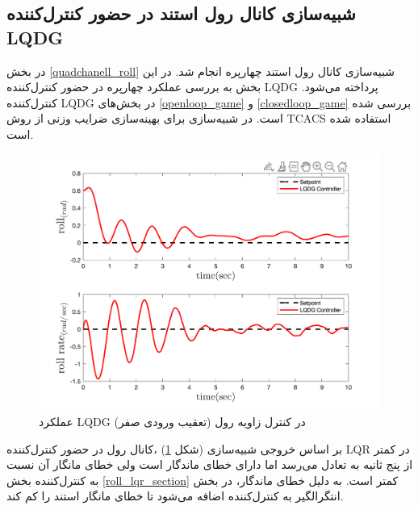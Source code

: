 \subsection{شبیه‌سازی کانال رول استند در حضور کنترل‌کننده LQDG}
در بخش
\ref{quadchanell_roll}
شبیه‌سازی کانال رول استند چهارپره انجام شد. در این بخش به بررسی عملکرد چهارپره در حضور کنترل‌کننده LQDG پرداخته می‌شود. کنترل‌کننده LQDG در بخش‌های
\ref{openloop_game}
و
\ref{closedloop_game}
بررسی شده است.
 در شبیه‌سازی برای بهینه‌سازی ضرایب وزنی از روش
TCACS \cite{Karimi2010}
استفاده شده است.
\begin{figure}[H]\label{lqdg_roll_fig}
	\includegraphics[width=12cm]{../Figures/MIL/LQDG/Roll/lqdg_roll.png}
	\centering
	\caption{عملكرد LQDG در کنترل زاويه رول (تعقیب ورودی صفر)}
\end{figure}
بر اساس خروجی شبیه‌سازی (شکل
\ref{lqdg_roll_fig})
،کانال رول در حضور کنترل‌کننده LQR در کمتر از پنج ثانیه به تعادل می‌رسد اما دارای خطای ماندگار است ولی خطای مانگار آن نسبت به کنترل‌کننده بخش
\ref{roll_lqr_section}
کمتر است. به دلیل خطای ماندگار، در بخش
انتگرالگیر به کنترل‌کننده اضافه می‌شود تا خطای مانگار استند را کم کند.

